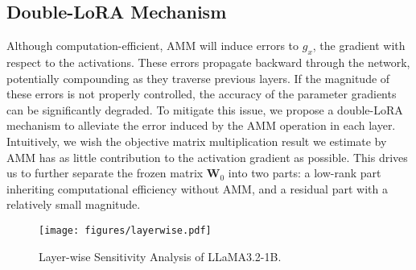 








\subsection{Double-LoRA Mechanism }
Although computation-efficient, AMM will induce errors to $g_x$, the gradient with respect to the activations. 
% 
These errors propagate backward through the network, potentially compounding as they traverse previous layers.
% 
If the magnitude of these errors is not properly controlled, the accuracy of the parameter gradients can be significantly degraded.
% 
To mitigate this issue, we propose a double-LoRA mechanism to alleviate the error induced by the AMM operation in each layer. Intuitively, we wish the objective matrix multiplication result we estimate by AMM has as little contribution to the activation gradient as possible. This drives us to further separate the frozen matrix $\mathbf{W}_0$ into two parts: a low-rank part inheriting computational efficiency without AMM, and a residual part with a relatively small magnitude.

\begin{figure}[!t]
    \centering
    \texttt{[image: figures/layerwise.pdf]}
    \vspace{-1em}
    \caption{\small
    Layer-wise Sensitivity Analysis of LLaMA3.2-1B. 
    }
    \label{fig:layerwise}
    \vspace{-1em}    
\end{figure}

